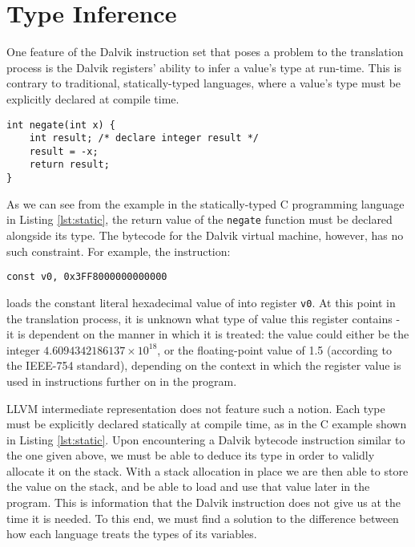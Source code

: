 \section{Type Inference}
\label{sec:typeinf}

One feature of the Dalvik instruction set that poses a problem to the translation process is the Dalvik registers' ability to infer a value's type at run-time. This is contrary to traditional, statically-typed languages, where a value's type must be explicitly declared at compile time.

\lstset{
	language=C,
	basicstyle=\small,
	stringstyle=\ttfamily
}

\begin{lstlisting}[frame=single, caption={C static typing example}, label=lst:static]
int negate(int x) {
    int result; /* declare integer result */
    result = -x;
    return result;
}
\end{lstlisting}

As we can see from the example in the statically-typed C programming language in Listing \ref{lst:static}, the return value of the \verb|negate| function must be declared alongside its type. The bytecode for the Dalvik virtual machine, however, has no such constraint. For example, the instruction:

\lstset{
	language=Assembly,
	basicstyle=\small,
	stringstyle=\ttfamily
}

\begin{lstlisting}[]
const v0, 0x3FF8000000000000
\end{lstlisting}

loads the constant literal hexadecimal value of  into register \verb|v0|. At this point in the translation process, it is unknown what type of value this register contains - it is dependent on the manner in which it is treated: the value could either be the integer $4.6094342186137 \times 10^{18}$, or the floating-point value of 1.5 (according to the IEEE-754 standard), depending on the context in which the register value is used in instructions further on in the program.

LLVM intermediate representation does not feature such a notion. Each type must be explicitly declared statically at compile time, as in the C example shown in Listing \ref{lst:static}. Upon encountering a Dalvik bytecode instruction similar to the one given above, we must be able to deduce its type in order to validly allocate it on the stack. With a stack allocation in place we are then able to store the value on the stack, and be able to load and use that value later in the program. This is information that the Dalvik instruction does not give us at the time it is needed. To this end, we must find a solution to the difference between how each language treats the types of its variables.

